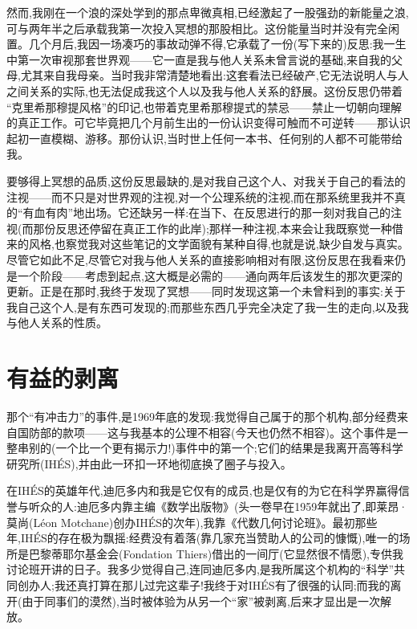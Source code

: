 然而,我刚在一个浪的深处学到的那点卑微真相,已经激起了一股强劲的新能量之浪,可与两年半之后承载我第一次投入冥想的那股相比。这份能量当时并没有完全闲置。几个月后,我因一场凑巧的事故动弹不得,它承载了一份(写下来的)反思:我一生中第一次审视那套世界观——它一直是我与他人关系未曾言说的基础,来自我的父母,尤其来自我母亲。当时我非常清楚地看出:这套看法已经破产,它无法说明人与人之间关系的实际,也无法促成我这个人以及我与他人关系的舒展。这份反思仍带着
“克里希那穆提风格”的印记,也带着克里希那穆提式的禁忌——禁止一切朝向理解的真正工作。可它毕竟把几个月前生出的一份认识变得可触而不可逆转——那认识起初一直模糊、游移。那份认识,当时世上任何一本书、任何别的人都不可能带给我。

要够得上冥想的品质,这份反思最缺的,是对我自己这个人、对我关于自己的看法的注视——而不只是对世界观的注视,对一个公理系统的注视,而在那系统里我并不真的“有血有肉”地出场。它还缺另一样:在当下、在反思进行的那一刻对我自己的注视(而那份反思还停留在真正工作的此岸);那样一种注视,本来会让我既察觉一种借来的风格,也察觉我对这些笔记的文学面貌有某种自得,也就是说,缺少自发与真实。尽管它如此不足,尽管它对我与他人关系的直接影响相对有限,这份反思在我看来仍是一个阶段——考虑到起点,这大概是必需的——通向两年后该发生的那次更深的更新。正是在那时,我终于发现了冥想——同时发现这第一个未曾料到的事实:关于我自己这个人,是有东西可发现的;而那些东西几乎完全决定了我一生的走向,以及我与他人关系的性质。

\section{有益的剥离}

那个“有冲击力”的事件,是1969年底的发现:我觉得自己属于的那个机构,部分经费来自国防部的款项——这与我基本的公理不相容(今天也仍然不相容)。这个事件是一整串别的(一个比一个更有揭示力!)事件中的第一个;它们的结果是我离开高等科学研究所(IHÉS),并由此一环扣一环地彻底换了圈子与投入。

在IHÉS的英雄年代,迪厄多内和我是它仅有的成员,也是仅有的为它在科学界赢得信誉与听众的人:迪厄多内靠主编《数学出版物》(头一卷早在1959年就出了,即莱昂·莫尚(Léon Motchane)创办IHÉS的次年),我靠《代数几何讨论班》。最初那些年,IHÉS的存在极为飘摇:经费没有着落(靠几家充当赞助人的公司的慷慨),唯一的场所是巴黎蒂耶尔基金会(Fondation Thiers)借出的一间厅(它显然很不情愿),专供我讨论班开讲的日子。我多少觉得自己,连同迪厄多内,是我所属这个机构的“科学”共同创办人;我还真打算在那儿过完这辈子!我终于对IHÉS有了很强的认同;而我的离开(由于同事们的漠然),当时被体验为从另一个“家”被剥离,后来才显出是一次解放。

